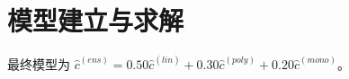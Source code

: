 \section{模型建立与求解}
最终模型为 $\hat c^{(ens)}=0.50\hat c^{(lin)}+0.30\hat c^{(poly)}+0.20\hat c^{(mono)}$。
